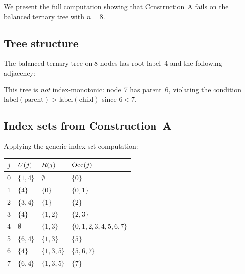 
We present the full computation showing that Construction~A fails on
the balanced ternary tree with $n = 8$.

\subsection*{Tree structure}

The balanced ternary tree on 8 nodes has root label~4 and the
following adjacency:
\begin{center}
\end{center}

This tree is \emph{not} index-monotonic: node~7 has parent~6,
violating the condition $\text{label}(\text{parent}) >
\text{label}(\text{child})$ since $6 < 7$.

\subsection*{Index sets from Construction~A}

Applying the generic index-set computation:
\begin{center}
\begin{tabular}{@{}clll@{}}
\toprule
$j$ & $U(j)$ & $R(j)$ & $\mathrm{Occ}(j)$ \\
\midrule
0 & $\{1, 4\}$       & $\emptyset$     & $\{0\}$ \\
1 & $\{4\}$           & $\{0\}$         & $\{0, 1\}$ \\
2 & $\{3, 4\}$       & $\{1\}$         & $\{2\}$ \\
3 & $\{4\}$           & $\{1, 2\}$     & $\{2, 3\}$ \\
4 & $\emptyset$       & $\{1, 3\}$     & $\{0,1,2,3,4,5,6,7\}$ \\
5 & $\{6, 4\}$       & $\{1, 3\}$     & $\{5\}$ \\
6 & $\{4\}$           & $\{1, 3, 5\}$ & $\{5, 6, 7\}$ \\
7 & $\{6, 4\}$       & $\{1, 3, 5\}$ & $\{7\}$ \\
\bottomrule
\end{tabular}
\end{center}

